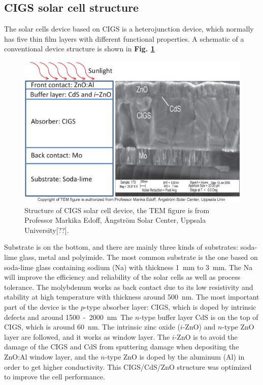 \documentclass[a4paper, 12pt, titlepage,oneside,drop]{kthesis}
\begin{document}
\subsection{CIGS solar cell structure}

The solar cells device based on CIGS is a heterojunction device, which normally has five thin film layers with different functional properties. A schematic of a conventional device structure is shown in  \textbf{Fig. \ref{device}}

\begin{figure}[H]
\centering
\includegraphics[scale=0.5]{devicestruc.eps} 
\caption{Structure of CIGS solar cell device, the TEM figure is from Professor Markika Edoff, Ångström Solar Center, Uppsala University[??].}
\label{device}
\end{figure}

Substrate is on the bottom, and there are mainly three kinds of substrates: soda-lime glass, metal and polyimide. The most common substrate is the one based on soda-lime glass containing sodium (Na) with thickness 
\SI{1} {\mm} to \SI{3} {\mm}. The Na will improve the efficiency and reliability of the solar cells as well as process tolerance. The molybdenum works as back contact due to its low resistivity and stability at high 
temperature with thickness around \SI{500} {\nm}. The most important part of the device is the $p$-type absorber layer: CIGS, which is doped by intrinsic defects and around \SI{1500} - \SI{2000} {\nm}. 
The $n$-type buffer layer CdS is on the top of CIGS, which is around \SI{60} {\nm}. The intrinsic zinc oxide ($i$-ZnO) and $n$-type ZnO layer are followed, and it works as window layer. The $i$-ZnO is to 
avoid the damage of the CIGS and CdS from sputtering damage when depositing the ZnO:Al window layer, and the $n$-type ZnO is doped by the aluminum (Al) in order to get higher conductivity. 
This CIGS/CdS/ZnO structure was optimized to improve the cell performance.
\end{document}
